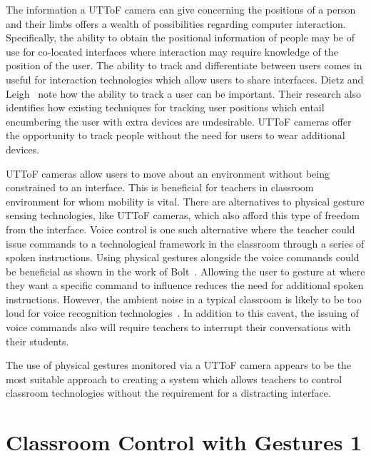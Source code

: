 \documentclass[manuscript, review, screen]{acmart}
\begin{document}
The information a \ac{UTToF} camera can give concerning the positions of a person and their limbs offers a wealth of possibilities regarding computer interaction.
Specifically, the ability to obtain the positional information of people may be of use for co-located interfaces where interaction may require knowledge of the position of the user.
The ability to track and differentiate between users comes in useful for interaction technologies which allow users to share interfaces.
Dietz and Leigh~\cite{Dietz2001} note how the ability to track a user can be important.
Their research also identifies how existing techniques for tracking user positions which entail encumbering the user with extra devices are undesirable.
\ac{UTToF} cameras offer the opportunity to track people without the need for users to wear additional devices.

\ac{UTToF} cameras allow users to move about an environment without being constrained to an interface.
This is beneficial for teachers in classroom environment for whom mobility is vital.
There are alternatives to physical gesture sensing technologies, like \ac{UTToF} cameras, which also afford this type of freedom from the interface.
Voice control is one such alternative where the teacher could issue commands to a technological framework in the classroom through a series of spoken instructions.
Using physical gestures alongside the voice commands could be beneficial as shown in the work of Bolt~\citeyearpar{Bolt1980}.
Allowing the user to gesture at where they want a specific command to influence reduces the need for additional spoken instructions.
However, the ambient noise in a typical classroom is likely to be too loud for voice recognition technologies~\cite{Cavalier1996,Goette1998,OHare1999}.
In addition to this caveat, the issuing of voice commands also will require teachers to interrupt their conversations with their students.

The use of physical gestures monitored via a \ac{UTToF} camera appears to be the most suitable approach to creating a system which allows teachers to control classroom technologies without the requirement for a distracting interface.


\section{Classroom Control with Gestures 1}  
\label{sec:classcontrol1}

\end{document}
